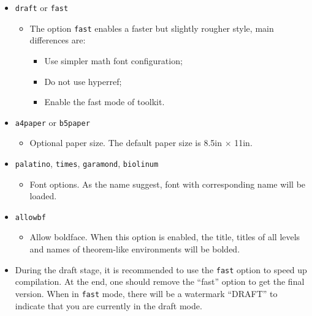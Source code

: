 \documentclass[allowbf,puretext]{beaulivre}
\theoremstyle{basic}
\theoremstyle{emphasis}
\theoremstyle{simple}
\newenvironment{tip}[1][Tip]{%
    \begin{tcolorbox}[breakable,
        enhanced,
        width = \textwidth,
        colback = paper, colbacktitle = paper,
        colframe = gray!50, boxrule=0.2mm,
        coltitle = black,
        fonttitle = \sffamily,
        attach boxed title to top left = {yshift=-\tcboxedtitleheight/2, xshift=.5cm},
        boxed title style = {boxrule=0pt, colframe=paper},
        before skip = 0.3cm,
        after skip = 0.3cm,
        top = 3mm,
        bottom = 3mm,
        title={\scshape\sffamily #1}]%
}{\end{tcolorbox}}
\begin{document}
\begin{itemize}
    \item \texttt{draft} or \texttt{fast}
        \begin{itemize}
            \item The option \verb|fast| enables a faster but slightly rougher style, main differences are:
            \begin{itemize}
                \item Use simpler math font configuration; 
                \item Do not use hyperref; 
                \item Enable the fast mode of \ProjLib{} toolkit.
            \end{itemize}
        \end{itemize}
    \item \texttt{a4paper} or \texttt{b5paper}
        \begin{itemize}
            \item Optional paper size. The default paper size is 8.5in $\times$ 11in.
        \end{itemize}
    \item \texttt{palatino}, \texttt{times}, \texttt{garamond}, \texttt{biolinum}
        \begin{itemize}
            \item Font options. As the name suggest, font with corresponding name will be loaded.
        \end{itemize}
    \item \texttt{allowbf}
        \begin{itemize}
            \item Allow boldface. When this option is enabled, the title, titles of all levels and names of theorem-like environments will be bolded.
        \end{itemize}
\end{itemize}

\begin{tip}
    \begin{itemize}
        \item During the draft stage, it is recommended to use the \verb|fast| option to speed up compilation. At the end, one should remove the ``fast'' option to get the final version. When in \verb|fast| mode, there will be a watermark ``DRAFT'' to indicate that you are currently in the draft mode.
    \end{itemize}
\end{tip}
\end{document}
